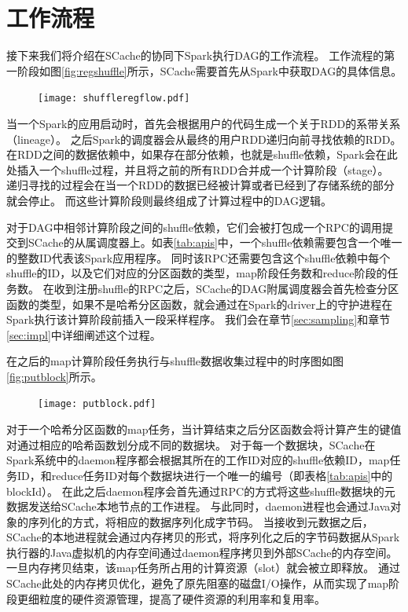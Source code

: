 \section{工作流程}

接下来我们将介绍在SCache的协同下Spark执行DAG的工作流程。
工作流程的第一阶段如图\ref{fig:regshuffle}所示，SCache需要首先从Spark中获取DAG的具体信息。

\begin{figure}[!htp]
	\centering
	\texttt{[image: shuffleregflow.pdf]}
\end{figure}

当一个Spark的应用启动时，首先会根据用户的代码生成一个关于RDD的系带关系（lineage）。
之后Spark的调度器会从最终的用户RDD递归向前寻找依赖的RDD。
在RDD之间的数据依赖中，如果存在部分依赖，也就是shuffle依赖，Spark会在此处插入一个shuffle过程，并且将之前的所有RDD合并成一个计算阶段（stage）。
递归寻找的过程会在当一个RDD的数据已经被计算或者已经到了存储系统的部分就会停止。
而这些计算阶段则最终组成了计算过程中的DAG逻辑。

对于DAG中相邻计算阶段之间的shuffle依赖，它们会被打包成一个RPC的调用提交到SCache的从属调度器上。如表\ref{tab:apis}中，一个shuffle依赖需要包含一个唯一的整数ID代表该Spark应用程序。
同时该RPC还需要包含这个shuffle依赖中每个shuffle的ID，以及它们对应的分区函数的类型，map阶段任务数和reduce阶段的任务数。
在收到注册shuffle的RPC之后，SCache的DAG附属调度器会首先检查分区函数的类型，如果不是哈希分区函数，就会通过在Spark的driver上的守护进程在Spark执行该计算阶段前插入一段采样程序。
我们会在章节\ref{sec:sampling}和章节\ref{sec:impl}中详细阐述这个过程。

在之后的map计算阶段任务执行与shuffle数据收集过程中的时序图如图\ref{fig:putblock}所示。

\begin{figure}[!htp]
	\centering
	\texttt{[image: putblock.pdf]}
\end{figure}

对于一个哈希分区函数的map任务，当计算结束之后分区函数会将计算产生的键值对通过相应的哈希函数划分成不同的数据块。
对于每一个数据块，SCache在Spark系统中的daemon程序都会根据其所在的工作ID对应的shuffle依赖ID，map任务ID，和reduce任务ID对每个数据块进行一个唯一的编号（即表格\ref{tab:apis}中的blockId）。
在此之后daemon程序会首先通过RPC的方式将这些shuffle数据块的元数据发送给SCache本地节点的工作进程。
与此同时，daemon进程也会通过Java对象的序列化的方式，将相应的数据序列化成字节码。
当接收到元数据之后，SCache的本地进程就会通过内存拷贝的形式，将序列化之后的字节码数据从Spark执行器的Java虚拟机的内存空间通过daemon程序拷贝到外部SCache的内存空间。
一旦内存拷贝结束，该map任务所占用的计算资源（slot）就会被立即释放。
通过SCache此处的内存拷贝优化，避免了原先阻塞的磁盘I/O操作，从而实现了map阶段更细粒度的硬件资源管理，提高了硬件资源的利用率和复用率。

